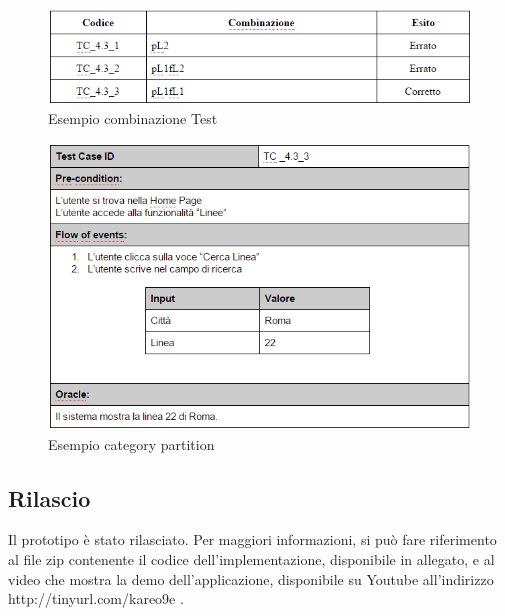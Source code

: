 \begin{figure}[h]
\centering
\includegraphics[scale=.5]{img/22.png}
\caption{Esempio combinazione Test}
\label{fig:mhs}
\end{figure} 

\begin{figure}[h]
\centering
\includegraphics[scale=.5]{img/23.png}
\caption{Esempio category partition }
\label{fig:mhs}
\end{figure} 

\subsection{Rilascio}
Il prototipo \`{e} stato rilasciato. Per maggiori informazioni, si pu\`{o} fare riferimento al file zip contenente il codice dell\rq implementazione, disponibile in allegato, e al video che mostra la demo dell\rq applicazione, disponibile su Youtube all\rq indirizzo http://tinyurl.com/kareo9e .
